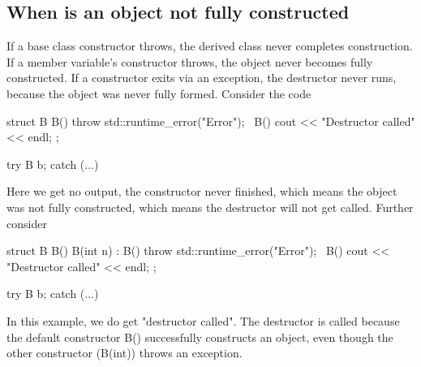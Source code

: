 \documentclass{report}
\begin{document}
    \subsection{When is an object not fully constructed}
    \bigbreak \noindent 
    If a base class constructor throws, the derived class never completes construction.
    \bigbreak \noindent 
    If a member variable's constructor throws, the object never becomes fully constructed.
    \bigbreak \noindent 
    If a constructor exits via an exception, the destructor never runs, because the object was never fully formed.
    \bigbreak \noindent 
    Consider the code
    \begin{cppcode}
        struct B {
            B() { throw std::runtime_error("Error"); }
            ~B() { cout << "Destructor called" << endl; }
        };

        try {
            B b;
        } catch (...) {

        }
    \end{cppcode}
    \bigbreak \noindent 
    Here we get no output, the constructor never finished, which means the object was not fully constructed, which means the destructor will not get called.
    \bigbreak \noindent 
    Further consider 
    \bigbreak \noindent 
    \begin{cppcode}
        struct B {
            B() {}
            B(int n) : B() { throw std::runtime_error("Error"); }
            ~B() { cout << "Destructor called" << endl; }
        };

        try {
            B b;
        } catch (...) {

        }
    \end{cppcode}
    \bigbreak \noindent 
    In this example, we do get "destructor called". The destructor is called because the default constructor B() successfully constructs an object, even though the other constructor (B(int)) throws an exception.

    \bigbreak \noindent 
\end{document}
